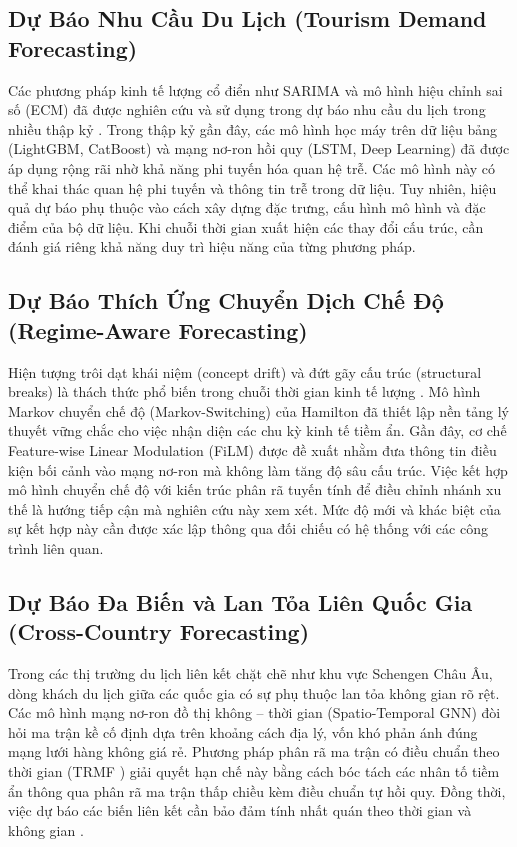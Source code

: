 \documentclass[10pt,journal,compsoc]{IEEEtran}
\begin{document}
\subsection{Dự Báo Nhu Cầu Du Lịch (Tourism Demand Forecasting)}
Các phương pháp kinh tế lượng cổ điển như SARIMA và mô hình hiệu chỉnh sai số (ECM) đã được nghiên cứu và sử dụng trong dự báo nhu cầu du lịch trong nhiều thập kỷ \cite{athanasopoulos2011tourism, song2019tourism}. Trong thập kỷ gần đây, các mô hình học máy trên dữ liệu bảng (LightGBM, CatBoost) \cite{dorogush2018catboost} và mạng nơ-ron hồi quy (LSTM, Deep Learning) \cite{claveria2016tourism, law2019tourism} đã được áp dụng rộng rãi nhờ khả năng phi tuyến hóa quan hệ trễ. Các mô hình này có thể khai thác quan hệ phi tuyến và thông tin trễ trong dữ liệu. Tuy nhiên, hiệu quả dự báo phụ thuộc vào cách xây dựng đặc trưng, cấu hình mô hình và đặc điểm của bộ dữ liệu. Khi chuỗi thời gian xuất hiện các thay đổi cấu trúc, cần đánh giá riêng khả năng duy trì hiệu năng của từng phương pháp.
\subsection{Dự Báo Thích Ứng Chuyển Dịch Chế Độ (Regime-Aware Forecasting)}
Hiện tượng trôi dạt khái niệm (concept drift) và đứt gãy cấu trúc (structural breaks) là thách thức phổ biến trong chuỗi thời gian kinh tế lượng \cite{clements1998forecasting}. Mô hình Markov chuyển chế độ (Markov-Switching) của Hamilton \cite{hamilton1989regime} đã thiết lập nền tảng lý thuyết vững chắc cho việc nhận diện các chu kỳ kinh tế tiềm ẩn. Gần đây, cơ chế Feature-wise Linear Modulation (FiLM) \cite{perez2018film} được đề xuất nhằm đưa thông tin điều kiện bối cảnh vào mạng nơ-ron mà không làm tăng độ sâu cấu trúc. Việc kết hợp mô hình chuyển chế độ với kiến trúc phân rã tuyến tính để điều chỉnh nhánh xu thế là hướng tiếp cận mà nghiên cứu này xem xét. Mức độ mới và khác biệt của sự kết hợp này cần được xác lập thông qua đối chiếu có hệ thống với các công trình liên quan.
\subsection{Dự Báo Đa Biến và Lan Tỏa Liên Quốc Gia (Cross-Country Forecasting)}
Trong các thị trường du lịch liên kết chặt chẽ như khu vực Schengen Châu Âu, dòng khách du lịch giữa các quốc gia có sự phụ thuộc lan tỏa không gian rõ rệt. Các mô hình mạng nơ-ron đồ thị không -- thời gian (Spatio-Temporal GNN) đòi hỏi ma trận kề cố định dựa trên khoảng cách địa lý, vốn khó phản ánh đúng mạng lưới hàng không giá rẻ. Phương pháp phân rã ma trận có điều chuẩn theo thời gian (TRMF \cite{yu2016trmf}) giải quyết hạn chế này bằng cách bóc tách các nhân tố tiềm ẩn thông qua phân rã ma trận thấp chiều kèm điều chuẩn tự hồi quy. Đồng thời, việc dự báo các biến liên kết cần bảo đảm tính nhất quán theo thời gian và không gian \cite{kourentzes2019coherent}.
\end{document}
